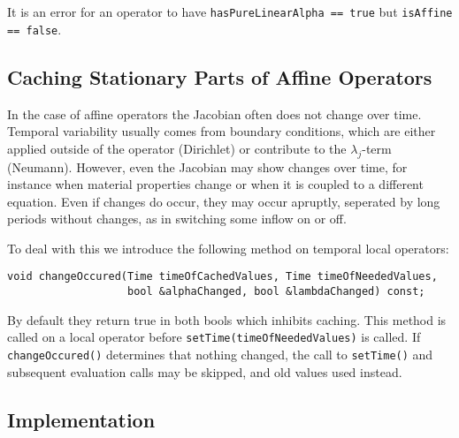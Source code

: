 \documentclass[11pt,a4paper,DIV11,%
notitlepage,oneside,abstracton,%
bibtotoc]{scrartcl}
\begin{document}
It is an error for an operator to have {\tt hasPureLinearAlpha == true} but
{\tt isAffine == false}.

\subsection{Caching Stationary Parts of Affine Operators}

In the case of affine operators the Jacobian often does not change over time.
Temporal variability usually comes from boundary conditions, which are either
applied outside of the operator (Dirichlet) or contribute to the
$\lambda_j$-term (Neumann).  However, even the Jacobian may show changes over
time, for instance when material properties change or when it is coupled to a
different equation.  Even if changes do occur, they may occur apruptly,
seperated by long periods without changes, as in switching some inflow on or
off.

To deal with this we introduce the following method on temporal local
operators:
\begin{lstlisting}
void changeOccured(Time timeOfCachedValues, Time timeOfNeededValues,
                   bool &alphaChanged, bool &lambdaChanged) const;
\end{lstlisting}
By default they return true in both bools which inhibits caching.  This method
is called on a local operator before {\tt setTime(timeOfNeededValues)} is
called.  If {\tt changeOccured()} determines that nothing changed, the call to
{\tt setTime()} and subsequent evaluation calls may be skipped, and old values
used instead.

\subsection{Implementation}
\end{document}
